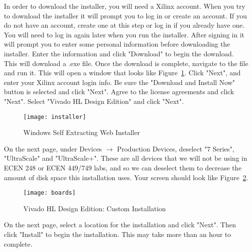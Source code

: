 \documentclass[11pt,twoside,titlepage]{article}
\begin{document}
\noindent
In order to download the installer, you will need a Xilinx account. When you try to download the installer it will prompt you to log in or create an account. If you do not have an account, create one at this step or log in if you already have one. You will need to log in again later when you run the installer. After signing in it will prompt you to enter some personal information before downloading the installer. Enter the information and click "Download" to begin the download. \\

\noindent
This will download a .exe file. Once the download is complete, navigate to the file and run it. This will open a window that looks like Figure~\ref{installer}. Click "Next", and enter your Xilinx account login info. Be sure the "Download and Install Now" button is selected and click "Next". Agree to the license agreements and click "Next". Select "Vivado HL Design Edition" and click "Next".\\

\begin{figure}[!h]
	\centering 
	\texttt{[image: installer]}
	\caption{Windows Self Extracting Web Installer}
	\label{installer}
\end{figure}

\noindent
On the next page, under Devices $\rightarrow$ Production Devices, deselect "7 Series", "UltraScale" and "UltraScale+". These are all devices that we will not be using in ECEN 248 or ECEN 449/749 labs, and so we can deselect them to decrease the amount of disk space this installation uses. Your screen should look like Figure~\ref{boards}. \\

\begin{figure}[!h]
	\centering 
	\texttt{[image: boards]}
	\caption{Vivado HL Design Edition: Custom Installation}
	\label{boards}
\end{figure}

\noindent
On the next page, select a location for the installation and click "Next". Then click "Install" to begin the installation. This may take more than an hour to complete.\\
\end{document}
